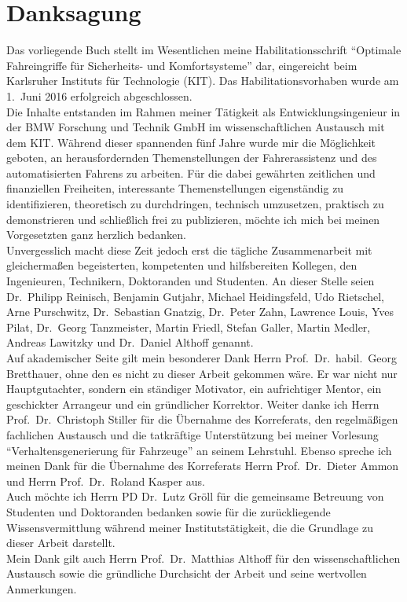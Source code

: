 \chapter*{Danksagung}
Das vorliegende Buch stellt im Wesentlichen meine Habilitationsschrift "`Optimale Fahreingriffe
für Sicherheits- und Komfortsysteme"' dar, eingereicht beim Karlsruher Instituts für Technologie (KIT). Das Habilitationsvorhaben wurde am 1.\ Juni 2016 erfolgreich abgeschlossen. \\
Die Inhalte entstanden im Rahmen meiner Tätigkeit als Entwicklungsingenieur in der BMW Forschung und Technik GmbH im wissenschaftlichen Austausch mit dem KIT. Während dieser spannenden fünf Jahre wurde mir die Möglichkeit geboten, an herausfordernden Themenstellungen der Fahrerassistenz und des automatisierten Fahrens zu arbeiten. Für die dabei gewährten zeitlichen und finanziellen Freiheiten, interessante Themenstellungen eigenständig zu identifizieren, theoretisch zu durchdringen, technisch umzusetzen, praktisch zu demonstrieren und schließlich frei zu publizieren, möchte ich mich bei meinen Vorgesetzten ganz herzlich bedanken. \\
Unvergesslich macht diese Zeit jedoch erst die tägliche Zusammenarbeit mit gleichermaßen begeisterten, kompetenten und hilfsbereiten Kollegen, den Ingenieuren, Technikern, Doktoranden und Studenten. An dieser Stelle seien Dr.\ Philipp Reinisch, Benjamin Gutjahr, Michael Heidingsfeld, Udo Rietschel, Arne Purschwitz, Dr.\ Sebastian Gnatzig, Dr.\ Peter Zahn, Lawrence Louis, Yves Pilat, Dr.\ Georg Tanzmeister, Martin Friedl, Stefan Galler, Martin Medler, Andreas Lawitzky und Dr.\ Daniel Althoff genannt. \\

Auf akademischer Seite gilt mein besonderer Dank Herrn Prof.\ Dr.\ habil.\ Georg Bretthauer, ohne den es nicht zu dieser Arbeit gekommen wäre. Er war nicht nur Hauptgutachter, sondern ein ständiger Motivator, ein aufrichtiger Mentor, ein geschickter Arrangeur und ein gründlicher Korrektor. Weiter danke ich Herrn Prof.\ Dr.\ Christoph Stiller für die Übernahme des Korreferats, den regelmäßigen fachlichen Austausch und die tatkräftige Unterstützung bei meiner Vorlesung "`Verhaltensgenerierung für Fahrzeuge"' an seinem Lehrstuhl. Ebenso spreche ich meinen Dank für die Übernahme des Korreferats Herrn Prof.\ Dr.\ Dieter Ammon und Herrn Prof.\ Dr.\ Roland Kasper aus. \\
Auch möchte ich Herrn PD Dr.\ Lutz Gröll für die gemeinsame Betreuung von Studenten und Doktoranden bedanken sowie für die zurückliegende Wissensvermittlung während meiner Institutstätigkeit, die die Grundlage zu dieser Arbeit darstellt. \\
Mein Dank gilt auch Herrn Prof.\ Dr.\ Matthias Althoff für den wissenschaftlichen Austausch sowie die gründliche Durchsicht der Arbeit und seine wertvollen Anmerkungen. \\

